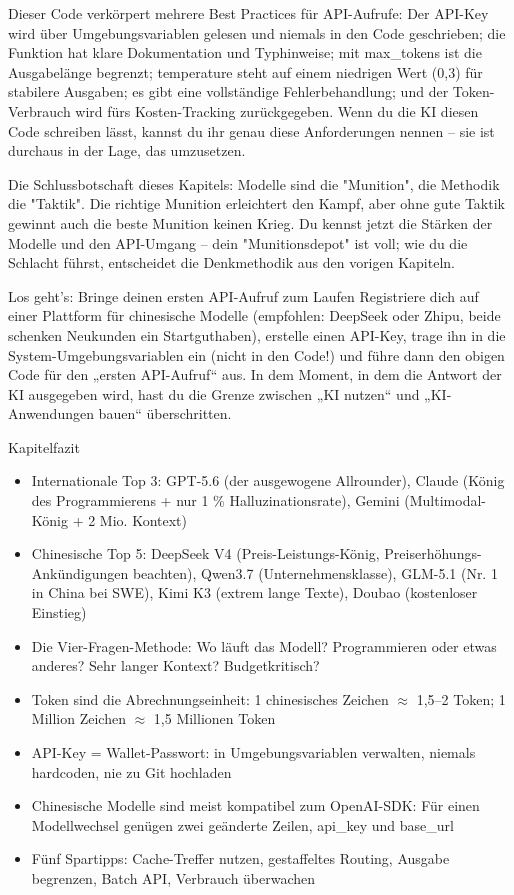 Dieser Code verkörpert mehrere Best Practices für API-Aufrufe: Der API-Key wird über Umgebungsvariablen gelesen und niemals in den Code geschrieben; die Funktion hat klare Dokumentation und Typhinweise; mit max\_tokens ist die Ausgabelänge begrenzt; temperature steht auf einem niedrigen Wert (0,3) für stabilere Ausgaben; es gibt eine vollständige Fehlerbehandlung; und der Token-Verbrauch wird fürs Kosten-Tracking zurückgegeben. Wenn du die KI diesen Code schreiben lässt, kannst du ihr genau diese Anforderungen nennen – sie ist durchaus in der Lage, das umzusetzen.

Die Schlussbotschaft dieses Kapitels: Modelle sind die "Munition", die Methodik die "Taktik". Die richtige Munition erleichtert den Kampf, aber ohne gute Taktik gewinnt auch die beste Munition keinen Krieg. Du kennst jetzt die Stärken der Modelle und den API-Umgang – dein "Munitionsdepot" ist voll; wie du die Schlacht führst, entscheidet die Denkmethodik aus den vorigen Kapiteln.

\begin{tcbpractice}{Los geht's: Bringe deinen ersten API-Aufruf zum Laufen}
Registriere dich auf einer Plattform für chinesische Modelle (empfohlen: DeepSeek oder Zhipu, beide schenken Neukunden ein Startguthaben), erstelle einen API-Key, trage ihn in die System-Umgebungsvariablen ein (nicht in den Code!) und führe dann den obigen Code für den „ersten API-Aufruf“ aus. In dem Moment, in dem die Antwort der KI ausgegeben wird, hast du die Grenze zwischen „KI nutzen“ und „KI-Anwendungen bauen“ überschritten.

\end{tcbpractice}

\begin{tcbsummary}{Kapitelfazit}
\begin{itemize}
  \item Internationale Top 3: GPT-5.6 (der ausgewogene Allrounder), Claude (König des Programmierens + nur 1 \% Halluzinationsrate), Gemini (Multimodal-König + 2 Mio. Kontext)
  \item Chinesische Top 5: DeepSeek V4 (Preis-Leistungs-König, Preiserhöhungs-Ankündigungen beachten), Qwen3.7 (Unternehmensklasse), GLM-5.1 (Nr. 1 in China bei SWE), Kimi K3 (extrem lange Texte), Doubao (kostenloser Einstieg)
  \item Die Vier-Fragen-Methode: Wo läuft das Modell? Programmieren oder etwas anderes? Sehr langer Kontext? Budgetkritisch?
  \item Token sind die Abrechnungseinheit: 1 chinesisches Zeichen $\approx$ 1,5–2 Token; 1 Million Zeichen $\approx$ 1,5 Millionen Token
  \item API-Key = Wallet-Passwort: in Umgebungsvariablen verwalten, niemals hardcoden, nie zu Git hochladen
  \item Chinesische Modelle sind meist kompatibel zum OpenAI-SDK: Für einen Modellwechsel genügen zwei geänderte Zeilen, api\_key und base\_url
  \item Fünf Spartipps: Cache-Treffer nutzen, gestaffeltes Routing, Ausgabe begrenzen, Batch API, Verbrauch überwachen
\end{itemize}

\end{tcbsummary}
